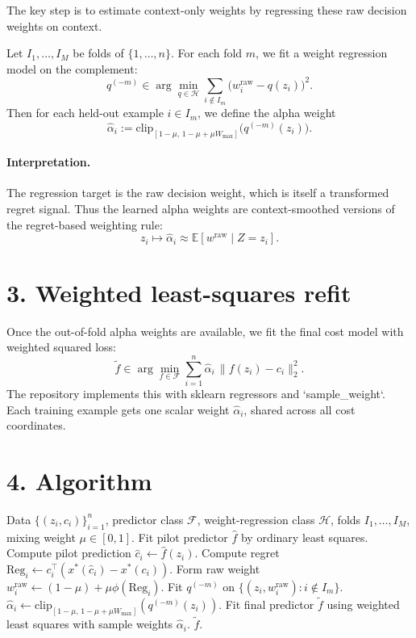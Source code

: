 \documentclass[11pt]{article}
\newcommand{\E}{\mathbb{E}}
\newcommand{\clip}{\mathrm{clip}}
\newcommand{\Reg}{\mathrm{Reg}}
\begin{document}
The key step is to estimate context-only weights by regressing these raw
decision weights on context.

Let $I_1,\dots,I_M$ be folds of $\{1,\dots,n\}$. For each fold $m$, we fit a
weight regression model on the complement:
\[
  q^{(-m)}
  \in \arg\min_{q \in \mathcal{H}}
  \sum_{i \notin I_m} \bigl(w_i^{\mathrm{raw}} - q(z_i)\bigr)^2.
\]
Then for each held-out example $i \in I_m$, we define the alpha weight
\[
  \hat\alpha_i
  := \clip_{[1-\mu,\,1-\mu+\mu W_{\max}]}\!\bigl(q^{(-m)}(z_i)\bigr).
\]

\paragraph{Interpretation.}
The regression target is the raw decision weight, which is itself a transformed
regret signal. Thus the learned alpha weights are context-smoothed versions of
the regret-based weighting rule:
\[
  z_i \mapsto \hat\alpha_i
  \approx \E\!\left[w^{\mathrm{raw}} \mid Z = z_i\right].
\]

\section*{3. Weighted least-squares refit}

Once the out-of-fold alpha weights are available, we fit the final cost model
with weighted squared loss:
\[
  \tilde f
  \in \arg\min_{f \in \mathcal{F}}
  \sum_{i=1}^n \hat\alpha_i \, \|f(z_i) - c_i\|_2^2.
\]
The repository implements this with sklearn regressors and `sample_weight`.
Each training example gets one scalar weight $\hat\alpha_i$, shared across all
cost coordinates.

\section*{4. Algorithm}

\begin{algorithm}[h]
\caption{Cross-fitted decision-weight regression}
\begin{algorithmic}[1]
\Require Data $\{(z_i,c_i)\}_{i=1}^n$, predictor class $\mathcal{F}$, weight-regression class $\mathcal{H}$, folds $I_1,\dots,I_M$, mixing weight $\mu \in [0,1]$.
\State Fit pilot predictor $\hat f$ by ordinary least squares.
    \State Compute pilot prediction $\hat c_i \gets \hat f(z_i)$.
    \State Compute regret $\Reg_i \gets c_i^\top(x^*(\hat c_i) - x^*(c_i))$.
    \State Form raw weight $w_i^{\mathrm{raw}} \gets (1-\mu) + \mu \phi(\Reg_i)$.
\EndFor
{}
        \State Fit $q^{(-m)}$ on $\{(z_i,w_i^{\mathrm{raw}}): i \notin I_m\}$.
        \State $\hat\alpha_i \gets \clip_{[1-\mu,\,1-\mu+\mu W_{\max}]}(q^{(-m)}(z_i))$.
    \EndFor
\EndFor
\State Fit final predictor $\tilde f$ using weighted least squares with sample weights $\hat\alpha_i$.
\State \Return $\tilde f$.
\end{algorithmic}
\end{algorithm}
\end{document}
